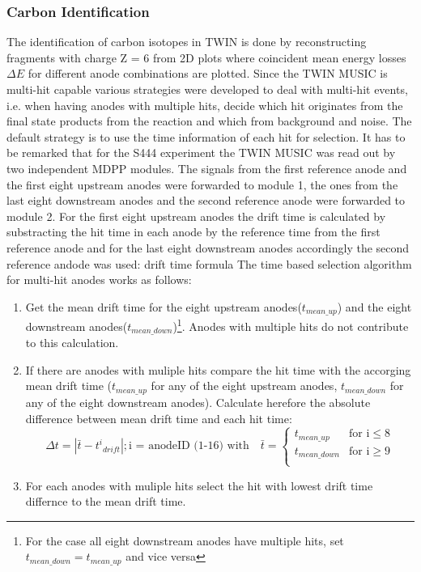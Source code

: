 \subsubsection{Carbon Identification}
The identification of carbon isotopes in TWIN is done by reconstructing fragments with charge Z = 6 from 2D plots where coincident mean energy losses $\Delta E$ for different anode combinations are plotted. Since the TWIN MUSIC is multi-hit capable various strategies were developed to deal with multi-hit events, i.e. when having anodes with multiple hits, decide which hit originates from the final state products from the reaction and which from background and noise.\newline
The default strategy is to use the time information of each hit for selection. It has to be remarked that for the S444 experiment the TWIN MUSIC was read out by two independent MDPP modules\cite{MDPP-16}. The signals from the first reference anode and the first eight upstream anodes were forwarded to module 1, the ones from the last eight downstream anodes and the second reference anode were forwarded to module 2. For the first eight upstream anodes the drift time is calculated by substracting the hit time in each anode by the reference time from the first reference anode and for the last eight downstream anodes accordingly the second reference andode was used:\newline
drift time formula
The time based selection algorithm for multi-hit anodes works as follows:\newline
\begin{enumerate}
\itemsep0em
\item Get the mean drift time for the eight upstream anodes($t_{mean\_up}$) and the eight downstream anodes($t_{mean\_down}$)\footnote{For the case all eight downstream anodes have multiple hits, set $t_{mean\_down} = t_{mean\_up}$ and vice versa}. Anodes with multiple hits do not contribute to this calculation.
\item If there are anodes with muliple hits compare the hit time with the accorging mean drift time ($t_{mean\_up}$ for any of the eight upstream anodes, $t_{mean\_down}$ for any of the eight downstream anodes). Calculate herefore the absolute difference between mean drift time and each hit time:
\begin{equation}
\Delta t = | \bar{t} - {t^i}_{drift}|;  \text{i = anodeID (1-16) with} \quad \bar{t} = 
\begin{cases}
t_{mean\_up} & \text{for i} \leq 8\\
t_{mean\_down} & \text{for i} \geq 9 \\
\end{cases}
\end{equation}
\item For each anodes with muliple hits select the hit with lowest drift time differnce to the mean drift time.
\end{enumerate}
